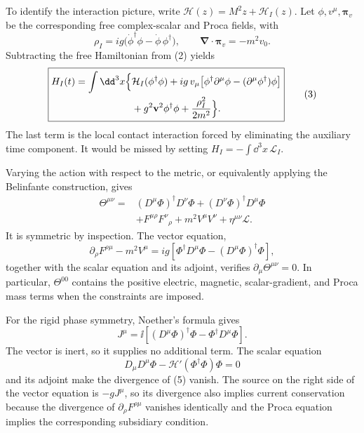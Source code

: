 \begin{enumerate}
To identify the interaction picture, write
\(\mathcal H(z)=M^2z+\mathcal H_I(z)\).  Let
\(\phi,v^\mu,\boldsymbol\pi_v\) be the corresponding free complex-scalar
and Proca fields, with
\[
 \rho_I=ig\bigl(\dot\phi^\dagger\phi-\dot\phi\,\phi^\dagger\bigr),
 \qquad
 \boldsymbol\nabla\cdot\boldsymbol\pi_v=-m^2v_0 .
\]
Subtracting the free Hamiltonian from (2) yields
\[
 \boxed{\begin{aligned}
 H_I(t)=\int \dd^3x\Bigl\{&
 \mathcal H_I(\phi^\dagger\phi)
 +ig\,v_\mu\!\left[
 \phi^\dagger\partial^\mu\phi
 -(\partial^\mu\phi^\dagger)\phi\right]\\
 &+g^2\mathbf v^2\phi^\dagger\phi
 +\frac{\rho_I^2}{2m^2}\Bigr\}.
 \end{aligned}}\tag{3}
\]
The last term is the local contact interaction forced by eliminating the
auxiliary time component.  It would be missed by setting
\(H_I=-\int \dd^3x\,\mathcal L_I\).

Varying the action with respect to the metric, or equivalently applying
the Belinfante construction, gives
\[
 \boxed{\begin{aligned}
 \Theta^{\mu\nu}={}&
 (D^\mu\Phi)^\dagger D^\nu\Phi
 +(D^\nu\Phi)^\dagger D^\mu\Phi\\
 &+F^{\mu\rho}F^\nu{}_\rho
 +m^2V^\mu V^\nu+\eta^{\mu\nu}\mathcal L .
 \end{aligned}}\tag{4}
\]
It is symmetric by inspection.  The vector equation,
\[
 \partial_\rho F^{\rho\mu}-m^2V^\mu
 =ig\left[\Phi^\dagger D^\mu\Phi
 -(D^\mu\Phi)^\dagger\Phi\right],
\]
together with the scalar equation and its adjoint, verifies
\(\partial_\mu\Theta^{\mu\nu}=0\).  In particular, \(\Theta^{00}\)
contains the positive electric, magnetic, scalar-gradient, and Proca
mass terms when the constraints are imposed.

For the rigid phase symmetry, Noether's formula gives
\[
 \boxed{\;
 J^\mu=\ii\left[(D^\mu\Phi)^\dagger\Phi
                  -\Phi^\dagger D^\mu\Phi\right].\;}
\tag{5}
\]
The vector is inert, so it supplies no additional term.  The scalar
equation
\[
 D_\mu D^\mu\Phi-\mathcal H'(\Phi^\dagger\Phi)\Phi=0
\]
and its adjoint make the divergence of (5) vanish.  The source on the
right side of the vector equation is \(-gJ^\mu\), so its divergence also
implies current conservation because the divergence of
\(\partial_\rho F^{\rho\mu}\) vanishes identically and the Proca equation
implies the corresponding subsidiary condition.


\end{enumerate}
